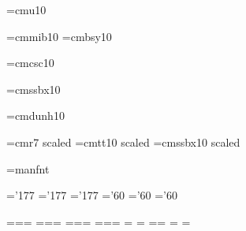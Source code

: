 \font\preloaded=cmu10 %

\font\preloaded=cmmib10 %
\font\preloaded=cmbsy10 %

\font\preloaded=cmcsc10 %

\font\preloaded=cmssbx10 %

\font\preloaded=cmdunh10 %

\font\preloaded=cmr7 scaled  %
\font\preloaded=cmtt10 scaled 
\font\preloaded=cmssbx10 scaled 

\font\preloaded=manfnt %


\let\preloaded=\undefined %

\skewchar\teni='177 \skewchar\seveni='177 \skewchar\fivei='177
\skewchar\tensy='60 \skewchar\sevensy='60 \skewchar\fivesy='60

=\tenrm {}=\sevenrm {}=\fiverm
\def\rm{\fam\z@\tenrm}
=\teni {}=\seveni {}=\fivei
\def\mit{\fam\@ne} \def\oldstyle{\fam\@ne\teni}
=\tensy {}=\sevensy {}=\fivesy
\def\cal{\fam\tw@}
=\tenex {}=\tenex {}=\tenex
\newfam\itfam \def\it{\fam\itfam\tenit} %
\textfont\itfam=\tenit
\newfam\slfam \def\sl{\fam\slfam\tensl} %
\textfont\slfam=\tensl
\newfam\bffam \def\bf{\fam\bffam\tenbf} %
\textfont\bffam=\tenbf \scriptfont\bffam=\sevenbf
\scriptscriptfont\bffam=\fivebf
\newfam\ttfam \def\tt{\fam\ttfam\tentt} %
\textfont\ttfam=\tentt




\def\frenchspacing{\sfcode`\.\@m \sfcode`\?\@m \sfcode`\!\@m
  \sfcode`\:\@m \sfcode`\;\@m \sfcode`\,\@m}
\def\nonfrenchspacing{\sfcode`\.3000\sfcode`\?3000\sfcode`\!3000%
  \sfcode`\:2000\sfcode`\;1500\sfcode`\,1250 }

\def\normalbaselines{\lineskip\normallineskip
  \baselineskip\normalbaselineskip \lineskiplimit\normallineskiplimit}

\def\^^M{\ } %
\def\^^I{\ } %

